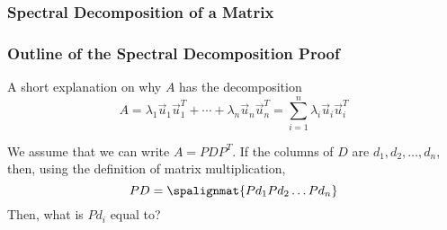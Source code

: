 \begin{frame}\frametitle{Spectral Decomposition of a Matrix}

    \begin{center}\end{center}

    
\end{frame}


\begin{frame}\frametitle{Outline of the Spectral Decomposition Proof }    

    A short explanation on why $A$ has the decomposition
        $$A = 
        \lambda _1 \vec u_1 \vec u_1 ^{T}  + \cdots + \lambda _n \vec u_n \vec u_n ^{T} 
        = \sum_{i=1}^{n} \lambda_i \vec u_i \vec u_i^T$$

    \pause 
    We assume that we can write $A=PDP^T$. \pause If the columns of $D$ are $d_1,d_2, \ldots , d_n$, then, using the definition of matrix multiplication, 
    $$PD = \spalignmat{Pd_1 Pd_2 \ldots Pd_n}$$
    \pause 
    Then, what is $Pd_i$ equal to? 
\end{frame}


